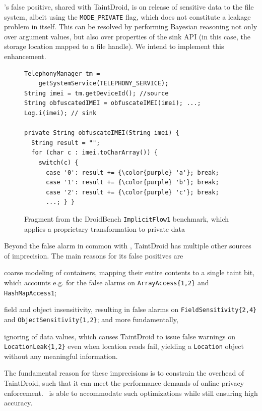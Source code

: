\Tool's false positive, shared with TaintDroid, is on release of sensitive data to the file system, albeit using the {\tt MODE\_PRIVATE} flag, which does not constitute a leakage problem in itself. This can be resolved by performing Bayesian reasoning not only over argument values, but also over properties of the sink API (in this case, the storage location mapped to a file handle). We intend to implement this enhancement. 

\begin{figure}
\begin{lstlisting}
TelephonyManager tm = 
    getSystemService(TELEPHONY_SERVICE);
String imei = tm.getDeviceId(); //source
String obfuscatedIMEI = obfuscateIMEI(imei); ...;
Log.i(imei); // sink

private String obfuscateIMEI(String imei) {
  String result = "";
  for (char c : imei.toCharArray()) { 
    switch(c) { 
      case '0': result += {\color{purple} 'a'}; break;
      case '1': result += {\color{purple} 'b'}; break;
      case '2': result += {\color{purple} 'c'}; break; 
      ...; } }
\end{lstlisting}
\caption{\label{Fi:dataTransform} Fragment from the DroidBench {\tt ImplicitFlow1} benchmark, which applies a proprietary transformation to private data}
\end{figure}


Beyond the false alarm in common with \Tool, TaintDroid has multiple other sources of imprecision. The main reasons for its false positives are
\begin{compactitem}
	\item coarse modeling of containers, mapping their entire contents to a single taint bit, which accounts e.g. for the false alarms on {\tt ArrayAccess\{1,2\}} and {\tt HashMapAccess1};
	\item field and object insensitivity, resulting in false alarms on {\tt FieldSensitivity\{2,4\}} and {\tt ObjectSensitivity\{1,2\}}; and more fundamentally,
	\item ignoring of data values, which causes TaintDroid to issue false warnings on {\tt LocationLeak\{1,2\}} even when location reads fail, yielding a {\tt Location} object without any meaningful information.
\end{compactitem} 
The fundamental reason for these imprecisions is to constrain the overhead of TaintDroid, such that it can meet the performance demands of online privacy enforcement. \Tool\ is able to accommodate such optimizations while still ensuring high accuracy. 

